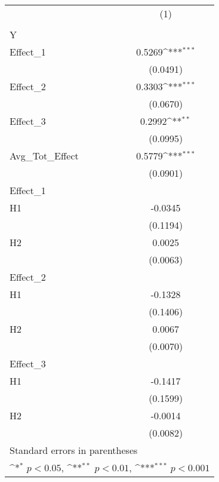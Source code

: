 \documentclass[varwidth]{standalone}
\begin{document}
{
\def\sym#1{\ifmmode^{#1}\else\(^{#1}\)\fi}
\begin{tabular}{l*{1}{c}}
\toprule
            &\multicolumn{1}{c}{(1)}\\
            &\multicolumn{1}{c}{} \\
\midrule
Y           &                     \\
Effect\_1    &      0.5269\sym{***}\\
            &    (0.0491)         \\
\addlinespace
Effect\_2    &      0.3303\sym{***}\\
            &    (0.0670)         \\
\addlinespace
Effect\_3    &      0.2992\sym{**} \\
            &    (0.0995)         \\
\addlinespace
Avg\_Tot\_Effect&      0.5779\sym{***}\\
            &    (0.0901)         \\
\midrule
Effect\_1    &                     \\
H1          &     -0.0345         \\
            &    (0.1194)         \\
\addlinespace
H2          &      0.0025         \\
            &    (0.0063)         \\
\midrule
Effect\_2    &                     \\
H1          &     -0.1328         \\
            &    (0.1406)         \\
\addlinespace
H2          &      0.0067         \\
            &    (0.0070)         \\
\midrule
Effect\_3    &                     \\
H1          &     -0.1417         \\
            &    (0.1599)         \\
\addlinespace
H2          &     -0.0014         \\
            &    (0.0082)         \\
\bottomrule
\multicolumn{2}{l}{\footnotesize Standard errors in parentheses}\\
\multicolumn{2}{l}{\footnotesize \sym{*} \(p<0.05\), \sym{**} \(p<0.01\), \sym{***} \(p<0.001\)}\\
\end{tabular}
}
\end{document}

